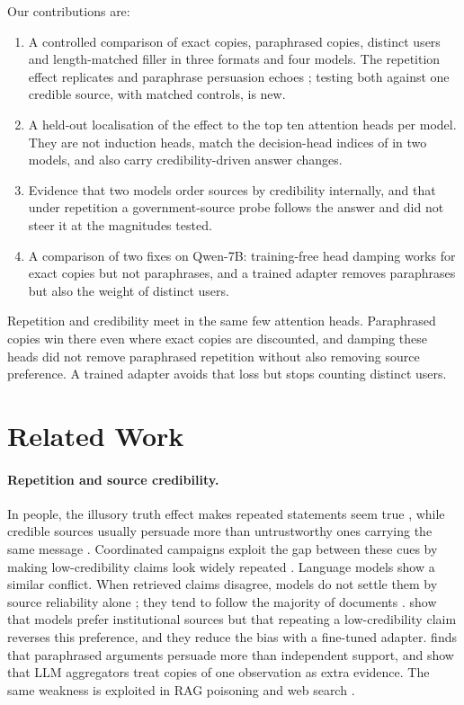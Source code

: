\documentclass[11pt]{article}
\begin{document}
Our contributions are:
\begin{enumerate}\itemsep0pt
\item A controlled comparison of exact copies, paraphrased copies, distinct users and length-matched filler in three formats and four models. The repetition effect replicates \citet{schuster2026whose} and paraphrase persuasion echoes \citet{naphade2026rational}; testing both against one credible source, with matched controls, is new.
\item A held-out localisation of the effect to the top ten attention heads per model. They are not induction heads, match the decision-head indices of \citet{sun2026persuaded} in two models, and also carry credibility-driven answer changes.
\item Evidence that two models order sources by credibility internally, and that under repetition a government-source probe follows the answer and did not steer it at the magnitudes tested.
\item A comparison of two fixes on Qwen-7B: training-free head damping works for exact copies but not paraphrases, and a trained adapter removes paraphrases but also the weight of distinct users.
\end{enumerate}
Repetition and credibility meet in the same few attention heads. Paraphrased copies win there even where exact copies are discounted, and damping these heads did not remove paraphrased repetition without also removing source preference. A trained adapter avoids that loss but stops counting distinct users.

\section{Related Work}
\paragraph{Repetition and source credibility.}
In people, the illusory truth effect makes repeated statements seem true \citep{hasher1977frequency,dechene2010truth}, while credible sources usually persuade more than untrustworthy ones carrying the same message \citep{hovland1951influence,pornpitakpan2004persuasiveness}. Coordinated campaigns exploit the gap between these cues by making low-credibility claims look widely repeated \citep{shao2018spread,keller2020political}.
Language models show a similar conflict. When retrieved claims disagree, models do not settle them by source reliability alone \citep{xu2024knowledge,wan2024evidence,pradhan2026trust}; they tend to follow the majority of documents \citep{jin2024tug}.
\citet{schuster2026whose} show that models prefer institutional sources but that repeating a low-credibility claim reverses this preference, and they reduce the bias with a fine-tuned adapter.
\citet{naphade2026rational} finds that paraphrased arguments persuade more than independent support, and \citet{gao2026count} show that LLM aggregators treat copies of one observation as extra evidence.
The same weakness is exploited in RAG poisoning \citep{pan2023risk,zou2025poisonedrag} and web search \citep{guerra2026datavoid,aggarwal2024geo}.
\end{document}

